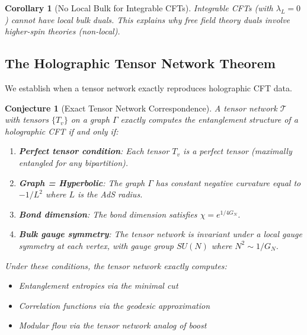 \documentclass[12pt,a4paper]{article}
\newtheorem{conjecture}[theorem]{Conjecture}
\newtheorem{corollary}[theorem]{Corollary}
\begin{document}
\begin{corollary}[No Local Bulk for Integrable CFTs]
Integrable CFTs (with $\lambda_L = 0$) cannot have local bulk duals. This explains why free field theory duals involve higher-spin theories (non-local).
\end{corollary}

\subsection{The Holographic Tensor Network Theorem}

We establish when a tensor network exactly reproduces holographic CFT data.

\begin{conjecture}[Exact Tensor Network Correspondence]
A tensor network $\mathcal{T}$ with tensors $\{T_v\}$ on a graph $\Gamma$ exactly computes the entanglement structure of a holographic CFT if and only if:
\begin{enumerate}
    \item \textbf{Perfect tensor condition}: Each tensor $T_v$ is a perfect tensor (maximally entangled for any bipartition).
    
    \item \textbf{Graph = Hyperbolic}: The graph $\Gamma$ has constant negative curvature equal to $-1/L^2$ where $L$ is the AdS radius.
    
    \item \textbf{Bond dimension}: The bond dimension satisfies $\chi = e^{1/4G_N}$.
    
    \item \textbf{Bulk gauge symmetry}: The tensor network is invariant under a local gauge symmetry at each vertex, with gauge group $SU(N)$ where $N^2 \sim 1/G_N$.
\end{enumerate}
Under these conditions, the tensor network exactly computes:
\begin{itemize}
    \item Entanglement entropies via the minimal cut
    \item Correlation functions via the geodesic approximation
    \item Modular flow via the tensor network analog of boost
\end{itemize}
\end{conjecture}
\end{document}
